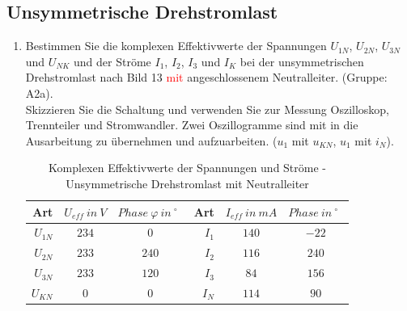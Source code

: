     \pagebreak
 	\subsection{Unsymmetrische Drehstromlast}
	 	\begin{enumerate}[label=\alph*)]
	 		\item Bestimmen Sie die komplexen Effektivwerte der Spannungen $U_{1N}$, $U_{2N}$, $U_{3N}$ und $U_{NK}$ und der Ströme $I_{1}$, $I_{2}$, $I_{3}$ und $I_{K}$ bei der unsymmetrischen Drehstromlast nach Bild 13 \textcolor{red}{mit} angeschlossenem Neutralleiter. (Gruppe: A2a).\\
			Skizzieren Sie die Schaltung und verwenden Sie zur Messung Oszilloskop, Trennteiler und Stromwandler. Zwei Oszillogramme sind mit in die Ausarbeitung zu übernehmen und aufzuarbeiten. ($u_{1}$ mit $u_{KN}$, $u_{1}$ mit $i_{N}$).
      \begin{table}[h!]
        \begin{center}
	 				\caption{Komplexen Effektivwerte der Spannungen und Ströme - Unsymmetrische Drehstromlast mit Neutralleiter}
	 				\begin{tabular}{r c c r c c}
	 					\hline
	 					Art & \( U_{eff}\ in\ V \) & \( Phase\ \varphi\ in\ ^\circ\ \ \)  & Art & \( I_{eff}\ in\ mA \) & \( Phase\ in\ ^\circ\ \ \) \\
	 					\hline
	 					$U_{1N}$ & \( 234 \) & \( 0   \) &
	 					$I_{1}$	 & \( 140 \) & \( -22 \) \\
	 					$U_{2N}$ & \( 233 \) & \( 240 \) &
	 					$I_{2}$	 & \( 116 \) & \( 240 \) \\
	 					$U_{3N}$ & \( 233 \) & \( 120 \) &
	 					$I_{3}$	 & \( 84  \) & \( 156 \) \\
	 					$U_{KN}$ & \( 0   \) & \( 0   \) &
	 					$I_{N}$	 & \( 114 \) & \( 90  \) \\
	 					\hline
	 				\end{tabular}
	 		\end{center}
    \end{table}
	 		

\end{enumerate}
